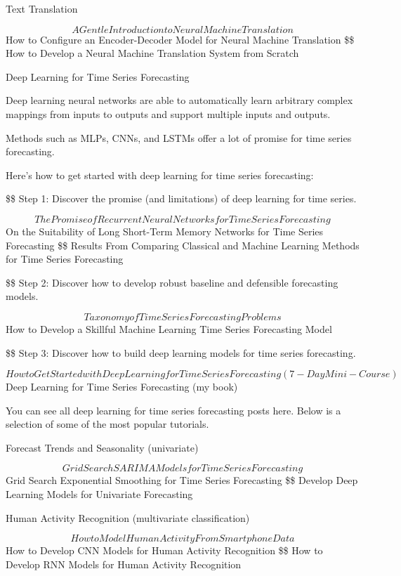 \documentclass[11pt]{article}
\begin{document}
Text Translation

$$ A Gentle Introduction to Neural Machine Translation
$$ How to Configure an Encoder-Decoder Model for Neural Machine Translation
\$\$ How to Develop a Neural Machine Translation System from Scratch

Deep Learning for Time Series Forecasting

Deep learning neural networks are able to automatically learn arbitrary complex mappings from inputs to outputs and support multiple inputs and outputs.

Methods such as MLPs, CNNs, and LSTMs offer a lot of promise for time series forecasting.

Here’s how to get started with deep learning for time series forecasting:

\$\$ Step 1: Discover the promise (and limitations) of deep learning for time series. 

$$ The Promise of Recurrent Neural Networks for Time Series Forecasting
 $$ On the Suitability of Long Short-Term Memory Networks for Time Series Forecasting
\$\$ Results From Comparing Classical and Machine Learning Methods for Time Series Forecasting

\$\$ Step 2: Discover how to develop robust baseline and defensible forecasting models. 

$$ Taxonomy of Time Series Forecasting Problems
 $$ How to Develop a Skillful Machine Learning Time Series Forecasting Model

\$\$ Step 3: Discover how to build deep learning models for time series forecasting. 

$$ How to Get Started with Deep Learning for Time Series Forecasting (7-Day Mini-Course)
 $$ Deep Learning for Time Series Forecasting (my book)

You can see all deep learning for time series forecasting posts here. Below is a selection of some of the most popular tutorials.

Forecast Trends and Seasonality (univariate)

$$ Grid Search SARIMA Models for Time Series Forecasting
$$ Grid Search Exponential Smoothing for Time Series Forecasting
\$\$ Develop Deep Learning Models for Univariate Forecasting

Human Activity Recognition (multivariate classification)

$$ How to Model Human Activity From Smartphone Data
$$ How to Develop CNN Models for Human Activity Recognition
\$\$ How to Develop RNN Models for Human Activity Recognition
\end{document}
